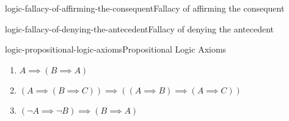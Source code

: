 \documentclass[preview]{standalone}
\begin{document}
\begin{snippetdefinition}{logic-fallacy-of-affirming-the-consequent}{Fallacy of affirming the consequent}
    \begin{prooftree}
    \end{prooftree}
\end{snippetdefinition}

\begin{snippetdefinition}{logic-fallacy-of-denying-the-antecedent}{Fallacy of denying the antecedent}
    \begin{prooftree}
    \end{prooftree}
\end{snippetdefinition}

\begin{snippetdefinition}{logic-propositional-logic-axioms}{Propositional Logic Axioms}{
    \begin{enumerate}
        \item \(A \implies (B \implies A)\)
        \item \((A \implies (B \implies C)) \implies ((A \implies B) \implies (A \implies C))\)
        \item \((\lnot A \implies \lnot B) \implies (B \implies A)\)
    \end{enumerate}
}
\end{snippetdefinition}
\end{document}
